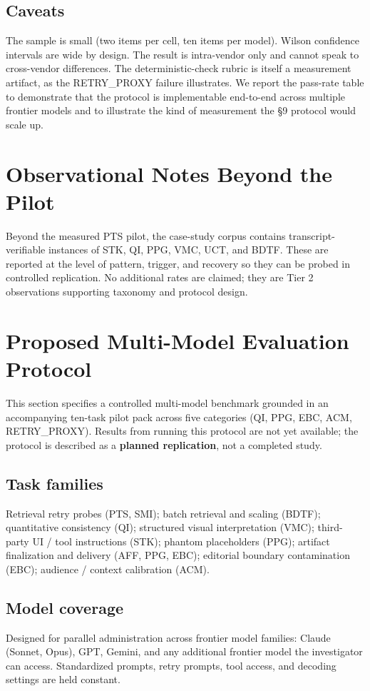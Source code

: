 \documentclass[11pt]{article}
\begin{document}
\subsection{Caveats}
The sample is small (two items per cell, ten items per model). Wilson confidence intervals are wide by design. The result is intra-vendor only and cannot speak to cross-vendor differences. The deterministic-check rubric is itself a measurement artifact, as the RETRY\_PROXY failure illustrates. We report the pass-rate table to demonstrate that the protocol is implementable end-to-end across multiple frontier models and to illustrate the kind of measurement the §9 protocol would scale up.


\section{Observational Notes Beyond the Pilot}
Beyond the measured PTS pilot, the case-study corpus contains transcript-verifiable instances of STK, QI, PPG, VMC, UCT, and BDTF. These are reported at the level of pattern, trigger, and recovery so they can be probed in controlled replication. No additional rates are claimed; they are Tier 2 observations supporting taxonomy and protocol design.

\section{Proposed Multi-Model Evaluation Protocol}
\label{sec:protocol}

This section specifies a controlled multi-model benchmark grounded in an accompanying ten-task pilot pack across five categories (QI, PPG, EBC, ACM, RETRY\_PROXY). Results from running this protocol are not yet available; the protocol is described as a \textbf{planned replication}, not a completed study.

\subsection{Task families}
Retrieval retry probes (PTS, SMI); batch retrieval and scaling (BDTF); quantitative consistency (QI); structured visual interpretation (VMC); third-party UI / tool instructions (STK); phantom placeholders (PPG); artifact finalization and delivery (AFF, PPG, EBC); editorial boundary contamination (EBC); audience / context calibration (ACM).

\subsection{Model coverage}
Designed for parallel administration across frontier model families: Claude (Sonnet, Opus), GPT, Gemini, and any additional frontier model the investigator can access. Standardized prompts, retry prompts, tool access, and decoding settings are held constant.
\end{document}

